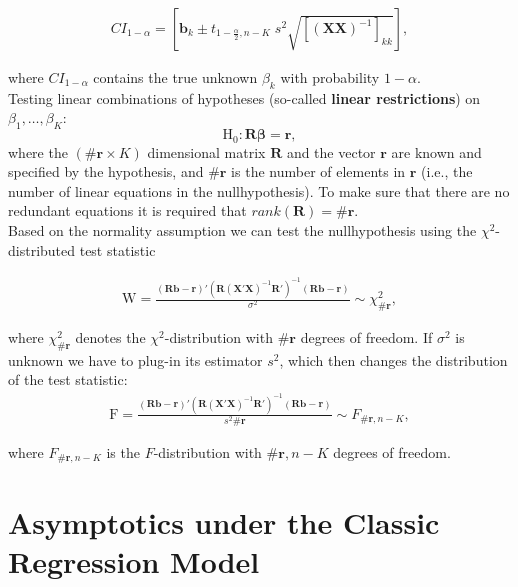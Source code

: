 \documentclass[]{book}
\theoremstyle{definition}
\theoremstyle{definition}
\theoremstyle{definition}
\theoremstyle{remark}
\begin{document}
\[
\begin{align*}
  CI_{1-\alpha} = \left[\mathbf{b}_k\pm t_{1-\frac{\alpha}{2},n-K}\;s^2\sqrt{\left[(\mathbf{X}\mathbf{X})^{-1}\right]_{kk}}\right],
\end{align*}
\]

where \(CI_{1-\alpha}\) contains the true unknown \(\beta_k\) with
probability \(1-\alpha\).\\
Testing linear combinations of hypotheses (so-called \textbf{linear
restrictions}) on \(\beta_1,\dots,\beta_K\):
\[\text{H}_0: \mathbf{R}\boldsymbol{\beta}=\mathbf{r},\] where the
\((\#\mathbf{r}\times K)\) dimensional matrix \(\mathbf{R}\) and the vector
\(\mathbf{r}\) are known and specified by the hypothesis, and
\(\#\mathbf{r}\) is the number of elements in \(\mathbf{r}\) (i.e., the
number of linear equations in the nullhypothesis). To make sure that
there are no redundant equations it is required that
\(rank(\mathbf{R})=\#\mathbf{r}\).\\
Based on the normality assumption we can test the nullhypothesis using
the \(\chi^2\)-distributed test statistic

\[
\begin{align*}
  \text{W}=\frac{(\mathbf{R}\mathbf{b}-\mathbf{r})'(\mathbf{R}(\mathbf{X}'\mathbf{X})^{-1}\mathbf{R}')^{-1}(\mathbf{R}\mathbf{b}-\mathbf{r})}{\sigma^2}\sim \chi^2_{\#\mathbf{r}},
\end{align*}
\]

where \(\chi^2_{\#\mathbf{r}}\) denotes the \(\chi^2\)-distribution with
\(\#\mathbf{r}\) degrees of freedom. If \(\sigma^2\) is unknown we have to
plug-in its estimator \(s^2\), which then changes the distribution of the
test statistic:
\[
\begin{align*}
  \text{F}=\frac{(\mathbf{R}\mathbf{b}-\mathbf{r})'(\mathbf{R}(\mathbf{X}'\mathbf{X})^{-1}\mathbf{R}')^{-1}(\mathbf{R}\mathbf{b}-\mathbf{r})}{s^2 \#\mathbf{r}}\sim F_{\#\mathbf{r},n-K},
\end{align*}
\]

where \(F_{\#\mathbf{r},n-K}\) is the \(F\)-distribution with
\(\#\mathbf{r},n-K\) degrees of freedom.

\hypertarget{asymptotics-under-the-classic-regression-model}{%
\section{Asymptotics under the Classic Regression Model}\label{asymptotics-under-the-classic-regression-model}}
\end{document}
